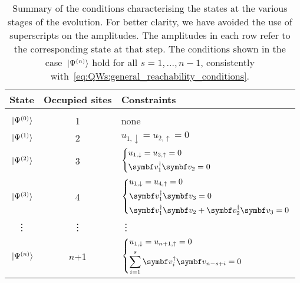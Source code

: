 \begin{table}[tbh]
\centering
\begin{tabular}{cc@{\quad}l}
    \toprule
    \textbf{State} & \textbf{Occupied sites} & \textbf{Constraints} \\
    \midrule \\
    $\ket*{\Psi^{(0)}}$ & 1 & none \\
    \addlinespace[2pt]
    $\ket*{\Psi^{(1)}}$ & 2 & $u_{1,\downarrow} = u_{2,\uparrow} = 0$ \\
    \addlinespace[5pt]
    $\ket*{\Psi^{(2)}}$ & 3 &
    $\begin{dcases}
        u_{1,\downarrow} = u_{3,\uparrow} = 0 \\
        \bs v_1^{\dagger} \bs v_2 = 0
    \end{dcases}$ \\
    \addlinespace[5pt]
    $\ket*{\Psi^{(3)}}$ & 4 &
    $\begin{dcases}
        u_{1,\downarrow} = u_{4,\uparrow} = 0 \\
        \bs v_1^{\dagger} \bs v_3 = 0 \\
        \bs v_1^{\dagger} \bs v_2 + \bs v_2^{\dagger} \bs v_3 = 0
    \end{dcases}$ \\\addlinespace[4pt]
    \vdots & \vdots & \qquad\quad\vdots \\
    $\ket*{\Psi^{(n)}}$ & $n$+1 &
    $\begin{dcases}
        u_{1,\downarrow} = u_{n + 1,\uparrow} = 0 \\
        \sum_{i=1}^s \bs v_i^{\dagger} \bs v_{n-s+i} = 0
    \end{dcases}$ \\
    \bottomrule
\end{tabular}
\caption{
    Summary of the conditions characterising the states at the various stages of the evolution.
    For better clarity, we have avoided the use of superscripts on the amplitudes.
The amplitudes in each row refer to the corresponding state at that step.
    The conditions shown in the case $\ket*{\Psi^{(n)}}$ hold for all $s=1,..., n-1$, consistently with~\cref{eq:QWs:general_reachability_conditions}.
}
\label{table:QWs:constraints}
\end{table}

